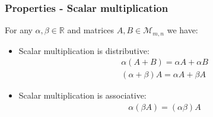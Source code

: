 \documentclass[usenames,dvipsnames,aspectratio=169,10pt]{beamer}
\numberwithin{equation}{section}
\begin{document}
\begin{frame}
\frametitle{Properties - Scalar multiplication}

For any $\alpha,\beta \in \mathbb{R}$ and matrices $A,B \in \mathcal{M}_{m,n}$ we have:


\begin{itemize}
\item Scalar multiplication is distributive: 
\begin{align*}
& \alpha(A + B) = \alpha A + \alpha B \\
& (\alpha + \beta)A = \alpha A + \beta A
\end{align*}

\item Scalar multiplication is associative: 
\begin{align*}
& \alpha(\beta A) = (\alpha \beta ) A
\end{align*}
\end{itemize}

\end{frame}
\end{document}
